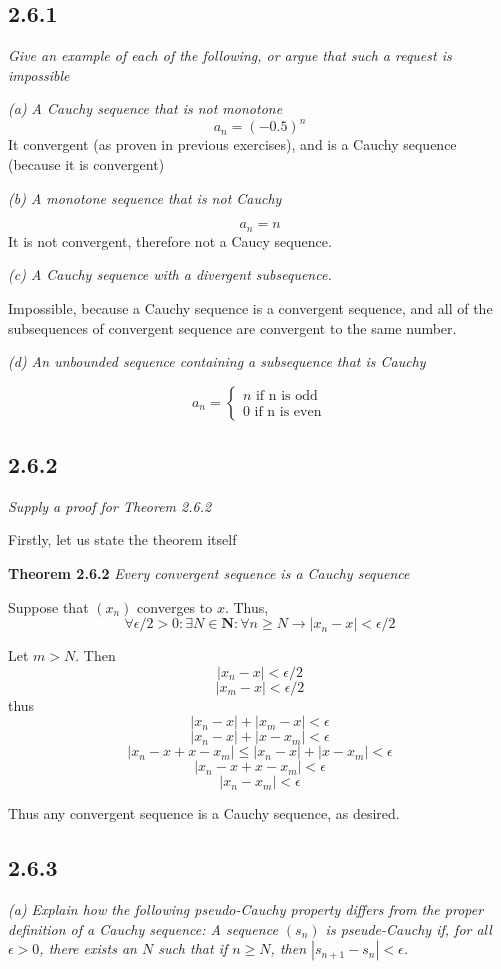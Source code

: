 \documentclass[11pt,oneside,titlepage]{book}
\begin{document}
\subsection*{2.6.1}
\textit{Give an example of each of the following, or argue that such a request
  is impossible }

\textit{(a) A Cauchy sequence that is not monotone}
$$a_n = (-0.5)^n$$
It convergent (as proven in previous exercises), and is a Cauchy sequence
(because it is convergent)

\textit{(b) A monotone sequence that is not Cauchy}

$$a_n = n$$
It is not convergent, therefore not a Caucy sequence.

\textit{(c) A Cauchy sequence with a divergent subsequence.}

Impossible, because a Cauchy sequence is a convergent sequence, and
all of the subsequences of convergent sequence are convergent to the
same number.

\textit{(d) An unbounded sequence containing a subsequence that is Cauchy}

\begin{equation}
  a_n =
  \begin{cases}
    n \text{ if n is odd } \\
    0 \text{ if n is even}
  \end{cases}
\end{equation}

\subsection*{2.6.2}
\textit{Supply a proof for Theorem 2.6.2}

Firstly, let us state the theorem itself

\textbf{Theorem 2.6.2}
\textit{Every convergent sequence is a Cauchy sequence}

Suppose that $(x_n)$ converges to $x$. Thus,
$$\forall \epsilon/2 > 0: \exists N \in \textbf{N}: \forall n \geq N \to
|x_n - x| < \epsilon/2$$

Let $m > N$. Then
$$|x_n - x| < \epsilon/2$$
$$|x_m - x| < \epsilon/2$$
thus
$$|x_n - x| + |x_m - x| < \epsilon$$
$$|x_n - x| + |x - x_m| < \epsilon$$
$$|x_n - x + x - x_m| \leq |x_n - x| + |x - x_m| < \epsilon$$
$$|x_n - x + x - x_m| < \epsilon$$
$$|x_n - x_m| < \epsilon$$

Thus any convergent sequence is a Cauchy sequence, as desired.

\subsection*{2.6.3}
\textit{(a) Explain how the following pseudo-Cauchy property differs
  from the proper definition of a Cauchy sequence: A sequence $(s_n)$ is
  pseude-Cauchy if, for all $\epsilon > 0$, there exists an $N$ such that
  if $n \geq N$, then $|s_{n + 1} - s_n| < \epsilon$.}
\end{document}
